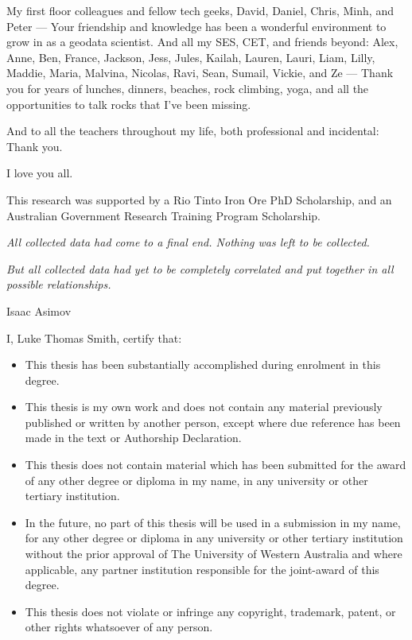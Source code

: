 \documentclass[12pt,a4paper,notitlepage]{report} %
\begin{document}
My first floor colleagues and fellow tech geeks, David, Daniel, Chris, Minh, and Peter --- Your friendship and knowledge has been a wonderful environment to grow in as a geodata scientist.
And all my SES, CET, and friends beyond: Alex, Anne, Ben, France, Jackson, Jess, Jules, Kailah, Lauren, Lauri, Liam, Lilly, Maddie, Maria, Malvina, Nicolas, Ravi, Sean, Sumail, Vickie, and Ze --- Thank you for years of lunches, dinners, beaches, rock climbing, yoga, and all the opportunities to talk rocks that I've been missing.

And to all the teachers throughout my life, both professional and incidental: Thank you.

I love you all.

\smallskip
\medskip
\noindent This research was supported by a Rio Tinto Iron Ore PhD Scholarship, and an Australian Government Research Training Program Scholarship.
\vfill{}

\epigraph{
    \textit{All collected data had come to a final end. Nothing was left to be collected.}

    \smallskip
    \textit{But all collected data had yet to be completely correlated and put together in all possible relationships.}}{Isaac Asimov}


\newpage{}
\tableofcontents{}
\listoffigures{}

\newpage{}
I, Luke Thomas Smith, certify that:
\begin{itemize}
    \item{}This thesis has been substantially accomplished during enrolment in this degree.
    \item{}This thesis is my own work and does not contain any material previously published or written by another person, except where due reference has been made in the text or Authorship Declaration.
    \item{}This thesis does not contain material which has been submitted for the award of any other degree or diploma in my name, in any university or other tertiary institution.
    \item{}In the future, no part of this thesis will be used in a submission in my name, for any other degree or diploma in any university or other tertiary institution without the prior approval of The University of Western Australia and where applicable, any partner institution responsible for the joint-award of this degree.
    \item{}This thesis does not violate or infringe any copyright, trademark, patent, or other rights whatsoever of any person.
\end{itemize}
\end{document}
